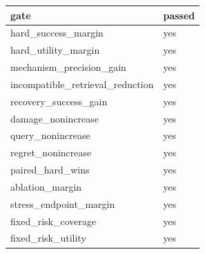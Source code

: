 \begin{tabular}{ll}
\toprule
gate & passed \\
\midrule
hard\_success\_margin & yes \\
hard\_utility\_margin & yes \\
mechanism\_precision\_gain & yes \\
incompatible\_retrieval\_reduction & yes \\
recovery\_success\_gain & yes \\
damage\_nonincrease & yes \\
query\_nonincrease & yes \\
regret\_nonincrease & yes \\
paired\_hard\_wins & yes \\
ablation\_margin & yes \\
stress\_endpoint\_margin & yes \\
fixed\_risk\_coverage & yes \\
fixed\_risk\_utility & yes \\
\bottomrule
\end{tabular}
